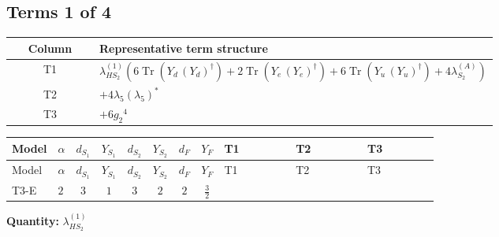 \documentclass[8pt]{article}
\begin{document}
\begin{landscape}
\subsection*{Terms 1 of 4}
\begin{center}
\begin{tabular}{@{}c >{\raggedright\arraybackslash}p{0.82\linewidth}@{}}
\toprule
Column & Representative term structure \\
\midrule
T1 & \(\displaystyle {\lambda_{HS_2}^{(1)}} (6 \operatorname{Tr}\!\left({Y_d}\,\left({Y_d}\right)^{\dagger}\right)+2 \operatorname{Tr}\!\left({Y_e}\,\left({Y_e}\right)^{\dagger}\right)+6 \operatorname{Tr}\!\left({Y_u}\,\left({Y_u}\right)^{\dagger}\right)+4 {\lambda_{S_2}^{(A)}})\) \\
\midrule
T2 & \(\displaystyle +4 {\lambda_5} \left({\lambda_5}\right)^{*}\) \\
\midrule
T3 & \(\displaystyle +6 {g_2}^4\) \\
\midrule
\bottomrule
\end{tabular}
\end{center}
\smallskip
\tiny
\begin{longtable}{@{}llcccccc >{\raggedright\arraybackslash}p{0.21\linewidth} >{\raggedright\arraybackslash}p{0.21\linewidth} >{\raggedright\arraybackslash}p{0.21\linewidth}@{}}
\toprule
Model & $\alpha$ & $d_{S_1}$ & $Y_{S_1}$ & $d_{S_2}$ & $Y_{S_2}$ & $d_F$ & $Y_F$ & T1 & T2 & T3 \\
\midrule
\endfirsthead
\toprule
Model & $\alpha$ & $d_{S_1}$ & $Y_{S_1}$ & $d_{S_2}$ & $Y_{S_2}$ & $d_F$ & $Y_F$ & T1 & T2 & T3 \\
\midrule
\endhead
T3-E & $2$ & $3$ & $1$ & $3$ & $2$ & $2$ & $\frac{3}{2}$ & \scriptsize\adjustbox{max width=\linewidth}{$\begin{gathered} {\lambda_{HS_2}^{(1)}} (6 \operatorname{Tr}\!\left({Y_d}\,\left({Y_d}\right)^{\dagger}\right)+2 \operatorname{Tr}\!\left({Y_e}\,\left({Y_e}\right)^{\dagger}\right)+6 \operatorname{Tr}\!\left({Y_u}\,\left({Y_u}\right)^{\dagger}\right)+4 {\lambda_{S_2}^{(A)}})\end{gathered}$} & \scriptsize\adjustbox{max width=\linewidth}{$\begin{gathered} +4 {\lambda_5} \left({\lambda_5}\right)^{*}\end{gathered}$} & \scriptsize\adjustbox{max width=\linewidth}{$\begin{gathered} +6 {g_2}^4\end{gathered}$} \\
\midrule
\bottomrule
\end{longtable}
\clearpage
\noindent\textbf{Quantity: }$\lambda_{HS_2}^{(1)}$\par\smallskip

\end{landscape}
\end{document}
